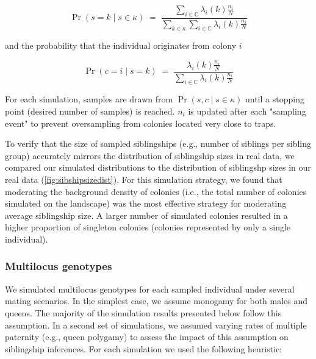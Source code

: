 \documentclass[12pt]{article}
\begin{document}

\[
\Pr(s = k \mid s \in \kappa) \;=\; \frac{\sum_{i \in \mathbb{C}} \lambda_i(k) \frac{n_i}{N}}{\sum_{k \in \kappa} \sum_{i \in \mathbb{C}} \lambda_i(k) \frac{n_i}{N}}
\]

and the probability that the individual originates from colony $i$


\[
\Pr(c = i \mid s = k) \;=\; \frac{\lambda_i(k) \frac{n_i}{N}}{\sum_{i \in \mathbb{C}} \lambda_i(k) \frac{n_i}{N}}
\]

For each simulation, samples are drawn from $\Pr(s, c \mid s \in \kappa)$ until a stopping point (desired number of samples) is reached. $n_i$ is updated after each "sampling event" to prevent oversampling from colonies located very close to traps.

To verify that the size of sampled siblingships (e.g., number of siblings per sibling group) accurately mirrors the distribution of siblingship sizes in real data, we compared our simulated distributions to the distribution of siblingshp sizes in our real data (\ref{fig:sibshipsizedist}). For this simulation strategy, we found that moderating the background density of colonies (i.e., the total number of colonies simulated on the landscape) was the most effective strategy for moderating average siblingship size. A larger number of simulated colonies resulted in a higher proportion of singleton colonies (colonies represented by only a single individual).



\subsubsection{Multilocus genotypes}
We simulated multilocus genotypes for each sampled individual under several mating scenarios. In the simplest case, we assume monogamy for both males and queens. The majority of the simulation results presented below follow this assumption. In a second set of simulations, we assumed varying rates of multiple paternity (e.g., queen polygamy) to assess the impact of this assumption on siblingship inferences. For each simulation we used the following heuristic:
\end{document}
